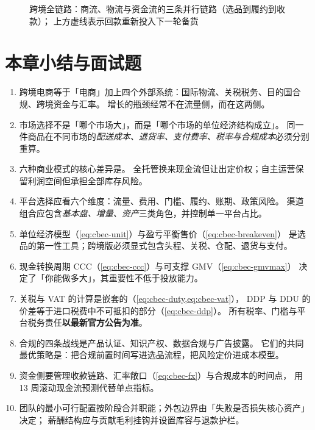 \begin{figure}[htbp]
{%
}
\caption{跨境全链路：商流、物流与资金流的三条并行链路（选品到履约到收款）；
上方虚线表示回款重新投入下一轮备货}
\label{fig:cbec-chain}
\end{figure}

\section{本章小结与面试题}
\label{sec:cbec-summary}

\begin{keypoint}[本章要点回顾]
\begin{enumerate}
  \item 跨境电商等于「电商」加上四个外部系统：国际物流、关税税务、目的国合规、跨境资金与汇率。
        增长的瓶颈经常不在流量侧，而在这两侧。
  \item 市场选择不是「哪个市场大」，而是「哪个市场的单位经济结构成立」。
        同一件商品在不同市场的\emph{配送成本、退货率、支付费率、税率与合规成本}必须分别重算。
  \item 六种商业模式的核心差异是。
        全托管换来现金流但让出定价权；自主运营保留利润空间但承担全部库存风险。
  \item 平台选择应看六个维度：流量、费用、门槛、履约、账期、政策风险。
        渠道组合应包含\emph{基本盘、增量、资产}三类角色，并控制单一平台占比。
  \item 单位经济模型（\cref{eq:cbec-unit}）与盈亏平衡售价（\cref{eq:cbec-breakeven}）
        是选品的第一性工具；跨境版必须显式包含头程、关税、仓配、退货与支付。
  \item 现金转换周期 CCC（\cref{eq:cbec-ccc}）与可支撑 GMV（\cref{eq:cbec-gmvmax}）
        决定了「你能做多大」，其重要性不低于投放能力。
  \item 关税与 VAT 的计算是嵌套的（\cref{eq:cbec-duty,eq:cbec-vat}），
        DDP 与 DDU 的价差等于进口税费中不可抵扣的部分（\cref{eq:cbec-ddp}）。
        所有税率、门槛与平台税务责任\textbf{以最新官方公告为准}。
  \item 合规的四条战线是产品认证、知识产权、数据合规与广告披露。
        它们的共同最优策略是：把合规前置时间写进选品流程，把风险定价进成本模型。
  \item 资金侧要管理收款链路、汇率敞口（\cref{eq:cbec-fx}）与合规成本的时间点，
        用 13 周滚动现金流预测代替单点指标。
  \item 团队的最小可行配置按阶段合并职能；外包边界由「失败是否损失核心资产」决定；
        薪酬结构应与贡献毛利挂钩并设置库容与退款护栏。
\end{enumerate}
\end{keypoint}

